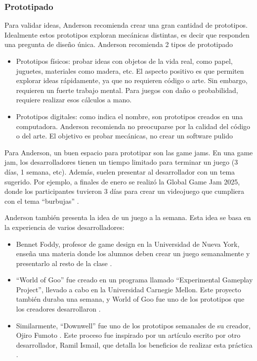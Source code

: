 \subsubsection{Prototipado}
\par Para validar ideas, Anderson recomienda crear una gran cantidad de prototipos. Idealmente estos prototipos exploran mecánicas distintas, es decir que responden una pregunta de diseño única. Anderson recomienda 2 tipos de prototipado
\begin{itemize}
  \item Prototipos físicos: probar ideas con objetos de la vida real, como papel, juguetes, materiales como madera, etc. El aspecto positivo es que permiten explorar ideas rápidamente, ya que no requieren código o arte. Sin embargo, requieren un fuerte trabajo mental. Para juegos con daño o probabilidad, requiere realizar esos cálculos a mano.
  \item Prototipos digitales: como indica el nombre, son prototipos creados en una computadora. Anderson recomienda no preocuparse por la calidad del código o del arte. El objetivo es probar mecánicas, no crear un software pulido
\end{itemize}
\par Para Anderson, un buen espacio para prototipar son las game jams. En una game jam, los desarrolladores tienen un tiempo limitado para terminar un juego (3 días, 1 semana, etc). Además, suelen presentar al desarrollador con un tema sugerido. Por ejemplo, a finales de enero se realizó la Global Game Jam 2025, donde los participantes tuvieron 3 días para crear un videojuego que cumpliera con el tema “burbujas” \cite{globalgamejamGlobalGameJam2025}.
\bigbreak
\par Anderson también presenta la idea de un juego a la semana. Esta idea se basa en la experiencia de varios desarrolladores:
\begin{itemize}
  \item Bennet Foddy, profesor de game design en la Universidad de Nueva York, enseña una materia donde los alumnos deben crear un juego semanalmente y presentarlo al resto de la clase \cite{GameWeekTeaching}.
  \item “World of Goo” \cite{WorldGooSteam} fue creado en un programa llamado “Experimental Gameplay Project”, llevado a cabo en la Universidad Carnegie Mellon. Este proyecto también duraba una semana, y World of Goo fue uno de los prototipos que los creadores desarrollaron \cite{InterviewGrayGabler,Flashback2008Making}.
  \item Similarmente, “Downwell” \cite{DownwellSteam} fue uno de los prototipos semanales de su creador, Ojiro Fumoto \cite{crecenteHeresOnedev8month2015}. Este proceso fue inspirado por un artículo escrito por otro desarrollador, Ramil Ismail, que detalla los beneficios de realizar esta práctica \cite{GameWeekGetting}.
\end{itemize}
